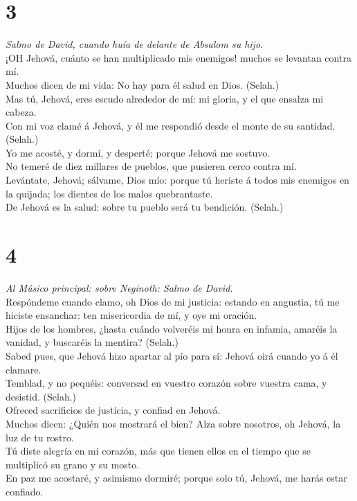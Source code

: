 \hypertarget{section-2}{%
\section{3}\label{section-2}}

 \emph{Salmo de David, cuando huía de delante de Absalom su
hijo.}\\
¡OH Jehová, cuánto se han multiplicado mis enemigos! muchos se levantan
contra mí.\\
 Muchos dicen de mi vida: No hay para él salud en Dios.
(Selah.)\\
 Mas tú, Jehová, eres escudo alrededor de mí: mi gloria, y
el que ensalza mi cabeza.\\
 Con mi voz clamé á Jehová, y él me respondió desde el monte
de su santidad. (Selah.)\\
 Yo me acosté, y dormí, y desperté; porque Jehová me
sostuvo.\\
 No temeré de diez millares de pueblos, que pusieren cerco
contra mí.\\
 Levántate, Jehová; sálvame, Dios mío: porque tú heriste á
todos mis enemigos en la quijada; los dientes de los malos
quebrantaste.\\
 De Jehová es la salud: sobre tu pueblo será tu bendición.
(Selah.)

\hypertarget{section-3}{%
\section{4}\label{section-3}}

 \emph{Al Músico principal: sobre Neginoth: Salmo de
David.}\\
Respóndeme cuando clamo, oh Dios de mi justicia: estando en angustia, tú
me hiciste ensanchar: ten misericordia de mí, y oye mi oración.\\
 Hijos de los hombres, ¿hasta cuándo volveréis mi honra en
infamia, amaréis la vanidad, y buscaréis la mentira? (Selah.)\\
 Sabed pues, que Jehová hizo apartar al pío para sí: Jehová
oirá cuando yo á él clamare.\\
 Temblad, y no pequéis: conversad en vuestro corazón sobre
vuestra cama, y desistid. (Selah.)\\
 Ofreced sacrificios de justicia, y confiad en Jehová.\\
 Muchos dicen: ¿Quién nos mostrará el bien? Alza sobre
nosotros, oh Jehová, la luz de tu rostro.\\
 Tú diste alegría en mi corazón, más que tienen ellos en el
tiempo que se multiplicó su grano y su mosto.\\
 En paz me acostaré, y asimismo dormiré; porque solo tú,
Jehová, me harás estar confiado.


